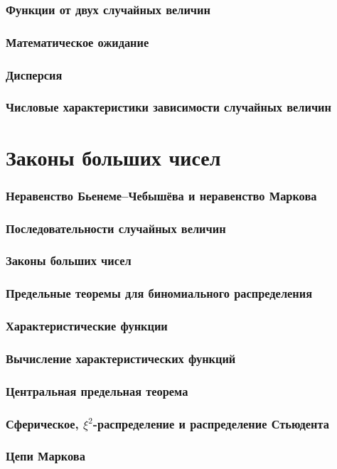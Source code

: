 \section{Функции от двух случайных величин}

\section{Математическое ожидание}

\section{Дисперсия}

\section{Числовые характеристики зависимости
случайных величин}


\part{Законы больших чисел}

\section{Неравенство Бьенеме–Чебышёва и
неравенство Маркова}

\section{Последовательности случайных величин}

\section{Законы больших чисел}

\section{Предельные теоремы для
биномиального распределения}

\section{Характеристические функции}

\section{Вычисление характеристических
функций}

\section{Центральная предельная теорема}

\section{Сферическое, $\xi^2$-распределение
и распределение Стьюдента}

\section{Цепи Маркова}









